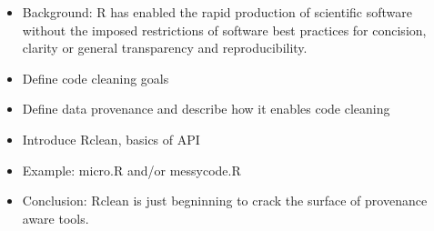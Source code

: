 
\begin{itemize}
\item Background: R has enabled the rapid production of scientific
  software without the imposed restrictions of software best practices
  for concision, clarity or general transparency and reproducibility.
\item Define code cleaning goals
\item Define data provenance and describe how it enables code cleaning
\item Introduce Rclean, basics of API
\item Example: micro.R and/or messycode.R
\item Conclusion: Rclean is just begninning to crack the surface of
  provenance aware tools.
\end{itemize}




